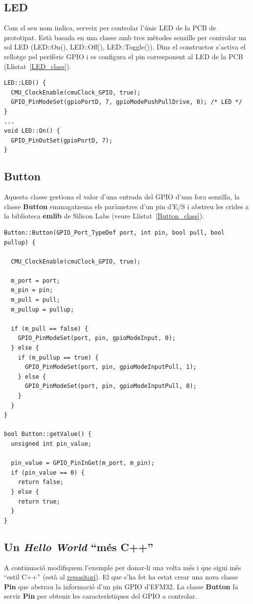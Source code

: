 \subsection{LED}
Com el seu nom indica, serveix per controlar l'únic \gls{LED} de la \gls{PCB} de prototipat. Està basada en una classe amb tres mètodes senzills per controlar un sol LED (LED::On(), LED::Off(), LED::Toggle()).
Dins el constructor s'activa el rellotge pel perifèric \gls{GPIO} i es configura el pin corresponent al LED de la PCB (Llistat~\ref{LED_class}).

 \begin{lstlisting}[caption={Part del codi de la classe LED},style=customc,label=LED_class]
LED::LED() {
  CMU_ClockEnable(cmuClock_GPIO, true);
  GPIO_PinModeSet(gpioPortD, 7, gpioModePushPullDrive, 0); /* LED */
}
...
void LED::On() {
  GPIO_PinOutSet(gpioPortD, 7);
}
\end{lstlisting}


\subsection{Button}
Aquesta classe gestiona el valor d'una entrada del \gls{GPIO} d'una fora senzilla, la classe {\bf Button} emmagatzema els paràmetres d'un pin d'E/S i abstreu les crides a la biblioteca {\bf emlib} de Silicon Labs (veure Llistat~\ref{Button_class}).

\begin{lstlisting}[caption={Part del codi de la classe LED},style=customc,label=Button_class]
Button::Button(GPIO_Port_TypeDef port, int pin, bool pull, bool pullup) {

  CMU_ClockEnable(cmuClock_GPIO, true);

  m_port = port;
  m_pin = pin;
  m_pull = pull;
  m_pullup = pullup;

  if (m_pull == false) {
    GPIO_PinModeSet(port, pin, gpioModeInput, 0);
  } else {
    if (m_pullup == true) {
      GPIO_PinModeSet(port, pin, gpioModeInputPull, 1);
    } else {
      GPIO_PinModeSet(port, pin, gpioModeInputPull, 0);
    }
  }
}

bool Button::getValue() {
  unsigned int pin_value;

  pin_value = GPIO_PinInGet(m_port, m_pin);
  if (pin_value == 0) {
    return false;
  } else {
    return true;
  }
}
\end{lstlisting}

\subsection{Un {\em Hello World} ``més C++''}
A continuació modifiquem l'exemple per donar-li una volta més i que sigui més ``estil C++'' (està al \href{https://github.com/mariusmm/cursembedded/tree/master/Simplicity/CXX_2}{repositori}). El que s'ha fet ha estat crear una nova classe {\bf Pin} que abstrau la informació d'un pin GPIO d'EFM32. La classe {\bf Button} fa servir {\bf Pin} per obtenir les característiques del GPIO a controlar.

